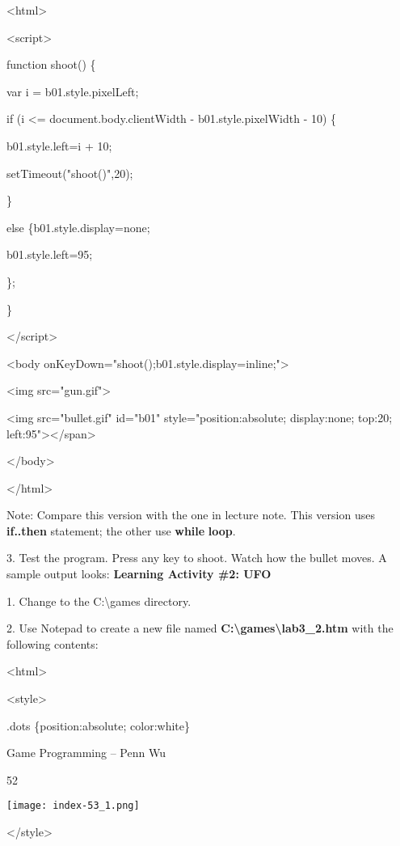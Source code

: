 \documentclass[
]{article}
\begin{document}
\textless html\textgreater{}

\textless script\textgreater{}

function shoot() \{

var i = b01.style.pixelLeft;

if (i \textless= document.body.clientWidth - b01.style.pixelWidth - 10)
\{

b01.style.left=i + 10;

setTimeout("shoot()",20);

\}

else \{b01.style.display=\textquotesingle none\textquotesingle;

b01.style.left=95;

\};

\}

\textless/script\textgreater{}

\textless body
onKeyDown="shoot();b01.style.display=\textquotesingle inline\textquotesingle;"\textgreater{}

\textless img src="gun.gif"\textgreater{}

\textless img src="bullet.gif" id="b01" style="position:absolute;
display:none; top:20; left:95"\textgreater\textless/span\textgreater{}

\textless/body\textgreater{}

\textless/html\textgreater{}

Note: Compare this version with the one in lecture note. This version
uses \textbf{if..then} statement; the other use \textbf{while}
\textbf{loop}.

3. Test the program. Press any key to shoot. Watch how the bullet moves.
A sample output looks: \textbf{Learning Activity \#2: UFO}

1. Change to the C:\textbackslash games directory.

2. Use Notepad to create a new file named
\textbf{C:\textbackslash games\textbackslash lab3\_2.htm} with the
following contents:

\textless html\textgreater{}

\textless style\textgreater{}

.dots \{position:absolute; color:white\}

Game Programming -- Penn Wu

52

\protect\hypertarget{index_split_004.htmlux5cux23p53}{}{}\texttt{[image: index-53\_1.png]}

\textless/style\textgreater{}
\end{document}
